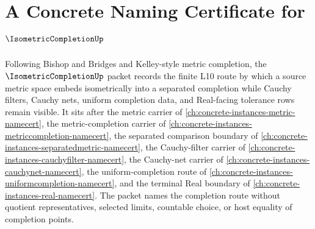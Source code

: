 \chapter{A Concrete Naming Certificate for $\IsometricCompletionUp$}
\label{ch:concrete-instances-isometric-completion-namecert}

Following Bishop and Bridges and Kelley-style metric completion, the $\IsometricCompletionUp$ packet records the finite L10 route by which a source metric space embeds isometrically into a separated completion while Cauchy filters, Cauchy nets, uniform completion data, and Real-facing tolerance rows remain visible. It sits after the metric carrier of \autoref{ch:concrete-instances-metric-namecert}, the metric-completion carrier of \autoref{ch:concrete-instances-metriccompletion-namecert}, the separated comparison boundary of \autoref{ch:concrete-instances-separatedmetric-namecert}, the Cauchy-filter carrier of \autoref{ch:concrete-instances-cauchyfilter-namecert}, the Cauchy-net carrier of \autoref{ch:concrete-instances-cauchynet-namecert}, the uniform-completion route of \autoref{ch:concrete-instances-uniformcompletion-namecert}, and the terminal Real boundary of \autoref{ch:concrete-instances-real-namecert}. The packet names the completion route without quotient representatives, selected limits, countable choice, or host equality of completion points.

